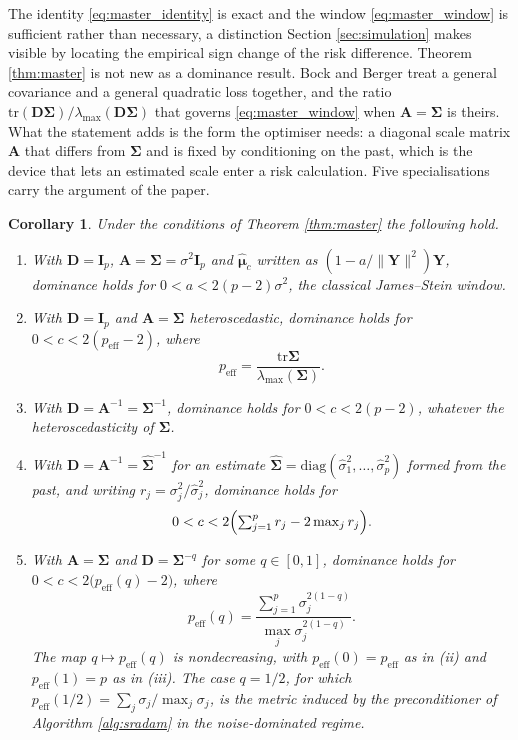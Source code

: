 \documentclass[pdflatex,sn-mathphys-num]{sn-jnl}%
\theoremstyle{thmstyleone}%
\newtheorem{corollary}[theorem]{Corollary}%
\theoremstyle{thmstyletwo}%
\theoremstyle{thmstylethree}%
\newcommand{\rev}[1]{{\color{blue}#1}}
\newenvironment{revblock}{\color{blue}}{}
\newcommand{\peff}{p_{\mathrm{eff}}}
\newcommand{\peffq}[1]{p_{\mathrm{eff}}(#1)}
\newcommand{\tr}{\mathrm{tr}}
\newcommand{\diag}{\mathrm{diag}}
\begin{document}
The identity \eqref{eq:master_identity} is exact and the window \eqref{eq:master_window} is sufficient rather than necessary, a distinction Section \ref{sec:simulation} makes visible by locating the empirical sign change of the risk difference. \rev{Theorem \ref{thm:master} is not new as a dominance result. Bock \cite{bock1975} and Berger \cite{berger1976jmva} treat a general covariance and a general quadratic loss together, and the ratio $\tr(\bm D\bm\Sigma)/\lambda_{\max}(\bm D\bm\Sigma)$ that governs \eqref{eq:master_window} when $\bm A=\bm\Sigma$ is theirs. What the statement adds is the form the optimiser needs: a diagonal scale matrix $\bm A$ that differs from $\bm\Sigma$ and is fixed by conditioning on the past, which is the device that lets an estimated scale enter a risk calculation.} \rev{Five} specialisations carry the argument of the paper.

\begin{corollary}
\label{cor:cases}
Under the conditions of Theorem \ref{thm:master} the following hold.
\begin{enumerate}
\item[(i)] With $\bm D=\bm I_p$, $\bm A=\bm\Sigma=\sigma^2\bm I_p$ and $\hat{\bm\mu}_c$ written as $(1-a/\|\bm Y\|^2)\bm Y$, dominance holds for $0<a<2(p-2)\sigma^2$, the classical James--Stein window.
\item[(ii)] With $\bm D=\bm I_p$ and $\bm A=\bm\Sigma$ heteroscedastic, dominance holds for $0<c<2(\peff-2)$, where
\begin{equation}
\peff=\frac{\tr\bm\Sigma}{\lambda_{\max}(\bm\Sigma)} .
\end{equation}
\item[(iii)] With $\bm D=\bm A^{-1}=\bm\Sigma^{-1}$, dominance holds for $0<c<2(p-2)$, whatever the heteroscedasticity of $\bm\Sigma$.
\item[(iv)] With $\bm D=\bm A^{-1}=\widehat{\bm\Sigma}^{-1}$ for an estimate $\widehat{\bm\Sigma}=\diag(\hat\sigma^2_1,\dots,\hat\sigma^2_p)$ formed from the past, and writing $r_j=\sigma^2_j/\hat\sigma^2_j$, dominance holds for
\begin{equation}
\label{eq:plugin_window}
0<c<2\Bigl(\textstyle\sum_{j=1}^{p}r_j-2\max_{j}r_j\Bigr) .
\end{equation}
\begin{revblock}
\item[(v)] With $\bm A=\bm\Sigma$ and $\bm D=\bm\Sigma^{-q}$ for some $q\in[0,1]$, dominance holds for $0<c<2\bigl(\peffq{q}-2\bigr)$, where
\begin{equation}
\label{eq:peff_q}
\peffq{q}=\frac{\sum_{j=1}^{p}\sigma_j^{2(1-q)}}{\max_{j}\sigma_j^{2(1-q)}} .
\end{equation}
The map $q\mapsto\peffq{q}$ is nondecreasing, with $\peffq{0}=\peff$ as in (ii) and $\peffq{1}=p$ as in (iii). The case $q=1/2$, for which $\peffq{1/2}=\sum_j\sigma_j/\max_j\sigma_j$, is the metric induced by the preconditioner of Algorithm \ref{alg:sradam} in the noise-dominated regime.
\end{revblock}
\end{enumerate}
\end{corollary}
\end{document}
